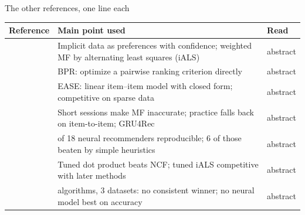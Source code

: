 \documentclass[aspectratio=169,10pt]{beamer}
\newcommand{\toindex}{\hfill\hyperlink{index}{\beamerreturnbutton{index}}}
\begin{document}
\begin{frame}[label=others]{The other references, one line each \toindex}
  \scriptsize
  \renewcommand{\arraystretch}{1.3}
  \begin{tabularx}{\textwidth}{@{}>{\raggedright\arraybackslash}p{2.6cm}>{\raggedright\arraybackslash}X>{\raggedright\arraybackslash}p{2.0cm}@{}}
    \toprule
    Reference & Main point used & Read \\
    \midrule
    \cite{hu2008} & Implicit data as preferences with confidence; weighted MF by alternating least squares (iALS) & abstract \\
    \cite{rendle2009} & BPR: optimize a pairwise ranking criterion directly & abstract \\
    \cite{steck2019} & EASE: linear item--item model with closed form; competitive on sparse data & abstract \\
    \cite{hidasi2016} & Short sessions make MF inaccurate; practice falls back on item-to-item; GRU4Rec & abstract \\
    \cite{dacrema2019} & 7 of 18 neural recommenders reproducible; 6 of those beaten by simple heuristics & abstract \\
    \cite{rendle2020,rendle2021} & Tuned dot product beats NCF; tuned iALS competitive with later methods & abstract \\
    \cite{anelli2022} & 10 algorithms, 3 datasets: no consistent winner; no neural model best on accuracy & abstract \\
    \bottomrule
  \end{tabularx}
\end{frame}
\end{document}
